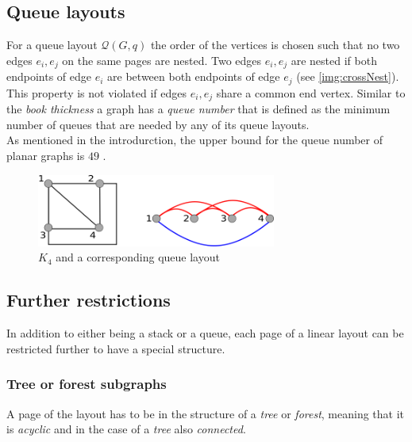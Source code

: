 \subsection{Queue layouts}
For a queue layout $\mathcal{Q}(G,q)$ the order of the vertices is chosen such that no two edges $e_i, e_j$ on the same pages are nested. Two edges $e_i, e_j$ are nested if both endpoints of edge $e_i$ are between both endpoints of edge $e_j$ (see \autoref{img:crossNest}). This property is not violated if edges $e_i, e_j$ share a common end vertex.
Similar to the \textit{book thickness} a graph has a \textit{queue number}  that is defined as the minimum number of queues that are needed by any of its queue layouts.\\
As mentioned in the introdurction, the upper bound for the queue number of planar graphs is $49$ \cite{duj19}.
\begin{figure}[!h]
\begin{center}
\includegraphics[width=0.7\textwidth]{figures/K4Queue.png}
\caption{$K_4$ and a corresponding queue layout}
\label{img:queueK4}
\end{center}
\end{figure}
\subsection{Further restrictions}
In addition to either being a stack or a queue, each page of a linear layout can be restricted further to have a special structure.
\subsubsection{Tree or forest subgraphs}
 
A page of the layout has to be in the structure of a \textit{tree} or \textit{forest}, meaning that it is \textit{acyclic} and in the case of a \textit{tree} also \textit{connected}.
